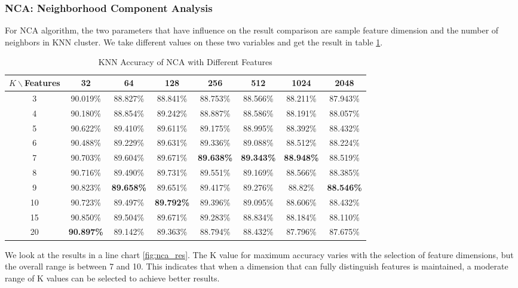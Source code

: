 \subsubsection{NCA: Neighborhood Component Analysis}
        For NCA algorithm, the two parameters that have influence on the result comparison are sample feature dimension and the number of neighbors in KNN cluster. We take different values on these two variables and get the result in table \ref{tab:nca}.
\begin{table}[htbp]
    \centering
    \caption{KNN Accuracy of NCA with Different Features}
    \begin{tabular}{@{}cccccccc@{}}
    \toprule
    $K \backslash $Features & 32 & 64 & 128 & 256 & 512 & 1024 & 2048 \\ \midrule
    3 & 90.019\% & 88.827\% & 88.841\% & 88.753\% & 88.566\% & 88.211\% & 87.943\% \\
    4 & 90.180\% & 88.854\% & 89.242\% & 88.887\% & 88.586\% & 88.191\% & 88.057\% \\
    5 & 90.622\% & 89.410\% & 89.611\% & 89.175\% & 88.995\% & 88.392\% & 88.432\% \\
    6 & 90.488\% & 89.229\% & 89.631\% & 89.336\% & 89.088\% & 88.512\% & 88.224\% \\
    7 & 90.703\% & 89.604\% & 89.671\% & \textbf{89.638\%} & \textbf{89.343\%} & \textbf{88.948\%} & 88.519\% \\
    8 & 90.716\% & 89.490\% & 89.731\% & 89.551\% & 89.169\% & 88.566\% & 88.385\% \\
    9 & 90.823\% & \textbf{89.658\%} & 89.651\% & 89.417\% & 89.276\% & 88.82\% & \textbf{88.546\%} \\
    10 & 90.723\% & 89.497\% & \textbf{89.792\%} & 89.396\% & 89.095\% & 88.606\% & 88.432\% \\
    15 & 90.850\% & 89.504\% & 89.671\% & 89.283\% & 88.834\% & 88.184\% & 88.110\% \\
    20 & \textbf{90.897\%} & 89.142\% & 89.363\% & 88.794\% & 88.432\% & 87.796\% & 87.675\% \\ \bottomrule
    \end{tabular}
    \label{tab:nca}
\end{table}

    We look at the results in a line chart \ref{fig:nca_res}. The K value for maximum accuracy varies with the selection of feature dimensions, but the overall range is between 7 and 10. This indicates that when a dimension that can fully distinguish features is maintained, a moderate range of K values can be selected to achieve better results. 
    
